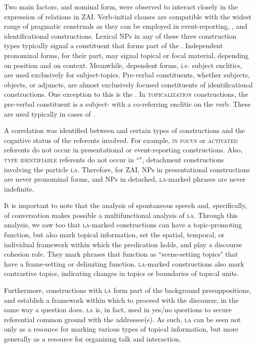 Two main factors,  and nominal form, were observed to interact closely in the expression of  relations in ZAI. Verb-initial clauses are compatible with the widest range of pragmatic construals as they can be employed in event-reporting, , and identificational constructions. Lexical NPs in any of these three construction types typically signal a constituent that forms part of the . Independent pronominal forms, for their part, may signal topical or focal material, depending on position and on context. Meanwhile, dependent forms, i.e. subject enclitics, are used exclusively for subject-topics. Pre-verbal constituents, whether subjects, objects, or adjuncts, are almost exclusively focused constituents of identificational constructions. One exception to this is the . In \textsc{topicalization} constructions, the pre-verbal constituent is a subject- with a co-referring enclitic on the verb. These are used typically in cases of .

A correlation was identified between  and certain types of constructions and the cognitive status of the referents involved. For example, \textsc{in focus} \citep{gundel1993} or \textsc{activated} referents do not occur in presentational or event-reporting constructions. Also, \textsc{type identifiable} referents do not occur in ``", detachment constructions involving the particle \textsc{la}. Therefore, for ZAI, NPs in presentational constructions are never pronominal forms, and NPs in detached, \textsc{la}-marked phrases are never indefinite.

It is important to note that the analysis of spontaneous speech and, specifically, of conversation makes possible a multifunctional analysis of \textsc{la}. Through this analysis, we saw too that \textsc{la}-marked constructions can have a topic-promoting function, but also mark topical information, set the spatial, temporal, or individual framework within which the predication holds, and play a discourse cohesion role. They mark phrases that function as ``scene-setting topics" that have a frame-setting or delimiting function. \textsc{la}-marked constructions also mark contrastive topics, indicating changes in topics or boundaries of topical units. 

Furthermore, constructions with \textsc{la} form part of the background presuppositions, and establish a framework within which to proceed with the discourse, in the same way a question does. \textsc{la} is, in fact, used in yes/no questions to secure referential common ground with the addressee(s). As such, \textsc{la} can be seen not only as a resource for marking various types of topical information, but more generally as a resource for organizing talk and interaction. 


